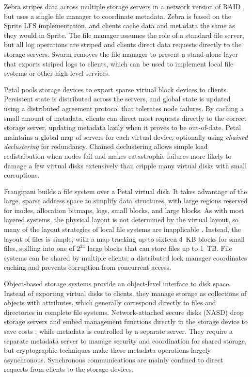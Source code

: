 Zebra \cite{hartman93} stripes data across multiple storage servers in a network version of RAID \cite{patterson}, but uses a single file manager to coordinate metadata. Zebra is based on the Sprite LFS implementation, and clients cache data and metadata the same as they would in Sprite. The file manager assumes the role of a standard file server, but all log operations are striped and clients direct data requests directly to the storage servers. Swarm \cite{hartman99} removes the file manager to present a stand-alone layer that exports striped logs to clients, which can be used to implement local file systems or other high-level services.

Petal \cite{lee95,lee96} pools storage devices to export sparse virtual block devices to clients. Persistent state is distributed across the servers, and global state is updated using a distributed agreement protocol that tolerates node failures. By caching a small amount of metadata, clients can direct most requests directly to the correct storage server, updating metadata lazily when it proves to be out-of-date. Petal maintains a global map of servers for each virtual device, optionally using \emph{chained declustering} for redundancy. Chained declustering \cite{hsiao} allows simple load redistribution when nodes fail and makes catastrophic failures more likely to damage a few virtual disks extensively than cripple many virtual disks with small corruptions.

Frangipani \cite{thekkath} builds a file system over a Petal virtual disk. It takes advantage of the large, sparse address space to simplify data structures, with large regions reserved for inodes, allocation bitmaps, logs, small blocks, and large blocks. As with most layered systems, the physical layout is not determined by the virtual layout, so many of the layout strategies of local file systems are inapplicable \cite{stein05}. Instead, the layout of files is simple, with a map tracking up to sixteen 4~KB blocks for small files, spilling into one of $2^{24}$ large blocks that can store files up to 1~TB. File systems can be shared by multiple clients; a distributed lock manager coordinates caching and prevents corruption from concurrent access.

Object-based storage systems \cite{factor,mesnier} provide an object-level interface to disk space. Instead of exporting virtual disks to clients, they manage storage as collections of objects with attributes, which generally correspond directly to files and directories in complete file systems. Network-attached secure disks (NASD) drop storage servers and embed management functions directly in the storage device to save costs \cite{gibson97,gibson98a}, while metadata is controlled by a separate server. They require a separate metadata server to manage security and coordination for shared storage, but cryptographic techniques make these metadata operations largely asynchronous. Synchronous communications are mainly confined to direct requests from clients to the storage devices. 

